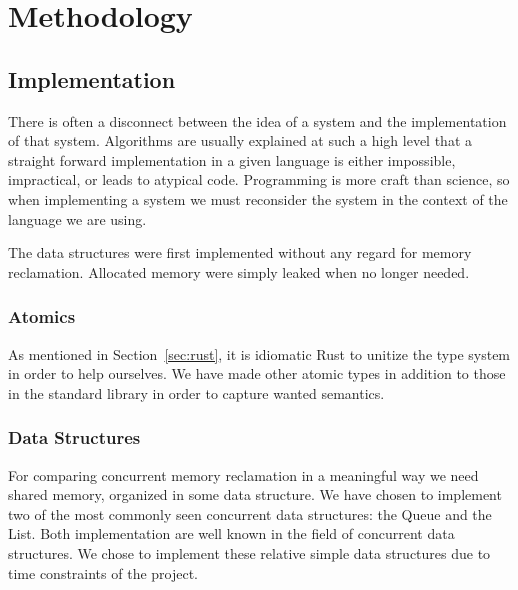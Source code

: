 \documentclass[b5paper]{report}
\begin{document}
\chapter{Methodology}


\section{Implementation}
There is often a disconnect between the idea of a system and the implementation
of that system. Algorithms are usually explained at such a high level that a
straight forward implementation in a given language is either impossible,
impractical, or leads to atypical code. Programming is more craft than
science, so when implementing a system we must reconsider the system in the
context of the language we are using.

The data structures were first implemented without any regard for memory
reclamation. Allocated memory were simply leaked when no longer needed.


\subsection{Atomics}


As mentioned in Section~\ref{sec:rust}, it is idiomatic Rust to unitize the type
system in order to help ourselves. We have made other atomic types in addition
to those in the standard library in order to capture wanted semantics.


\subsection{Data Structures}
\label{sec:data-structures}

For comparing concurrent memory reclamation in a meaningful way we need shared
memory, organized in some data structure. We have chosen to implement two of the
most commonly seen concurrent data structures: the Queue and the List. Both
implementation are well known in the field of concurrent data structures. We
chose to implement these relative simple data structures due to time constraints
of the project.
\end{document}
